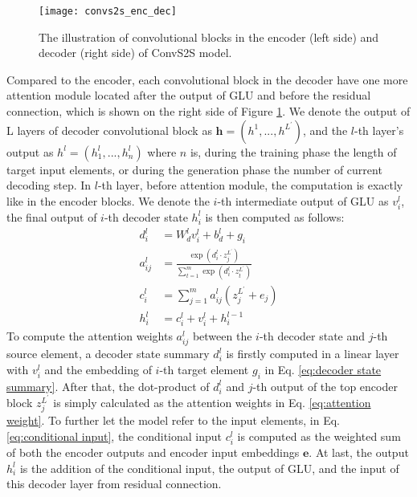 \begin{figure}[h]
\texttt{[image: convs2s\_enc\_dec]}
\centering
\caption{The illustration of convolutional blocks in the encoder (left side) and decoder (right side) of ConvS2S model.}
\label{figure:convs2s enc dec}
\end{figure}

Compared to the encoder, each convolutional block in the decoder have one more attention module located after the output of GLU and before the residual connection, which is shown on the right side of Figure \ref{figure:convs2s enc dec}. We denote the output of L layers of decoder convolutional block as $ \textbf{h} = (h^{1},...,h^{L^{'}}) $, and the $ l $-th layer's output as $ h^{l} = (h_{1}^{l},...,h_{n}^{l}) $ where $ n $ is, during the training phase the length of target input elements, or during the generation phase the number of current decoding step. In $ l $-th layer, before attention module, the computation is exactly like in the encoder blocks. We denote the $ i $-th intermediate output of GLU as $ v^{l}_{i} $, the final output of $ i $-th decoder state $ h_{i}^{l} $ is then computed as follows:
\begin{align}
d^{l}_{i} &= W^{l}_{d}v^{l}_{i} + b^{l}_{d} + g_{i} \label{eq:decoder state summary}\\
a^{l}_{ij} &= \frac{\exp(d^{l}_{i}\cdot z_{j}^{L^{'}})}{\sum_{t=1}^{m} \exp(d^{l}_{i}\cdot z_{t}^{L^{'}})} \label{eq:attention weight}\\
c^{l}_{i} &= \sum_{j=1}^{m} a^{l}_{ij}(z^{L^{'}}_{j}+e_{j}) \label{eq:conditional input}\\
h^{l}_{i} &= c^{l}_{i} + v^{l}_{i} + h^{l-1}_{i} \label{eq:decoder output}
\end{align}
To compute the attention weights $ a^{l}_{ij} $ between the $ i $-th decoder state and $ j $-th source element, a decoder state summary $ d^{l}_{i} $ is firstly computed in a linear layer with $ v^{l}_{i} $ and the embedding of $ i $-th target element $ g_{i} $ in Eq. \ref{eq:decoder state summary}. After that, the dot-product of $ d^{l}_{i} $ and $ j $-th output of the top encoder block $ z_{j}^{L^{'}} $ is simply calculated as the attention weights in Eq. \ref{eq:attention weight}. To further let the model refer to the input elements, in Eq. \ref{eq:conditional input}, the conditional input $ c_{i}^{l} $ is computed as the weighted sum of both the encoder outputs and encoder input embeddings $ \textbf{e} $. At last, the output $ h_{i}^{l} $ is the addition of the conditional input, the output of GLU, and the input of this decoder layer from residual connection. 

